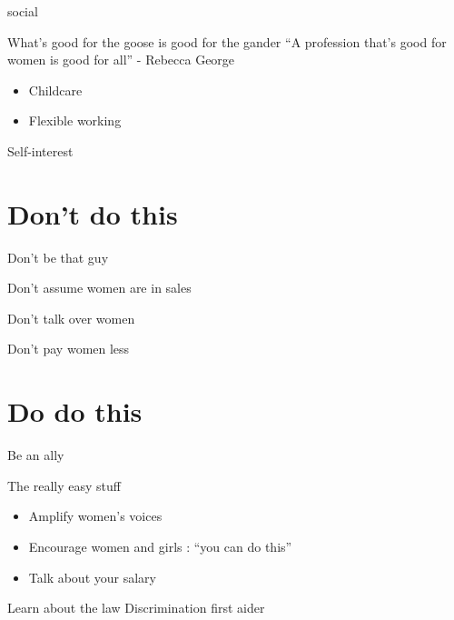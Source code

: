 \documentclass[xcolor=table]{beamer}
\begin{document}
\begin{frame}{social}

\end{frame}

\begin{frame}{What's good for the goose is good for the gander}
	``A profession that's good for women is good for all'' - Rebecca George 

	\begin{itemize}
		\item Childcare
		\item Flexible working
	\end{itemize}
\end{frame}

\begin{frame}{Self-interest}

\end{frame}

\section{Don't do this}

\begin{frame}{Don't be that guy}

\end{frame}

\begin{frame}{Don't assume women are in sales}

\end{frame}
\begin{frame}{Don't talk over women}

\end{frame}
\begin{frame}{Don't pay women less}

\end{frame}

\section{Do do this}

\begin{frame}{Be an ally}

\end{frame}
\begin{frame}{The really easy stuff}
	\begin{itemize}
		\item Amplify women's voices
		\item Encourage women and girls : ``you can do this''
		\item Talk about your salary
	\end{itemize}
\end{frame}
\begin{frame}{Learn about the law}
	Discrimination first aider

\end{frame}
\end{document}
